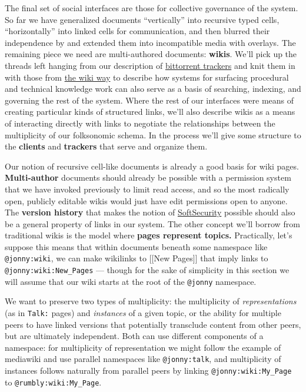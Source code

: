 The final set of social interfaces are those for collective governance
of the system. So far we have generalized documents ``vertically'' into
recursive typed cells, ``horizontally'' into linked cells for
communication, and then blurred their independence by and extended them
into incompatible media with overlays. The remaining piece we need are
multi-authored documents: \textbf{wikis}. We'll pick up the threads left
hanging from our description of
\protect\hyperlink{archives-need-communities}{bittorrent trackers} and
knit them in with those from \protect\hyperlink{the-wiki-way}{the wiki
way} to describe how systems for surfacing procedural and technical
knowledge work can also serve as a basis of searching, indexing, and
governing the rest of the system. Where the rest of our interfaces were
means of creating particular kinds of structured links, we'll also
describe wikis as a means of interacting directly with links to
negotiate the relationships between the multiplicity of our folksonomic
schema. In the process we'll give some structure to the \textbf{clients}
and \textbf{trackers} that serve and organize them.

Our notion of recursive cell-like documents is already a good basis for
wiki pages. \textbf{Multi-author} documents should already be possible
with a permission system that we have invoked previously to limit read
access, and so the most radically open, publicly editable wikis would
just have edit permissions open to anyone. The \textbf{version history}
that makes the notion of
\href{http://meatballwiki.org/wiki/SoftSecurity}{SoftSecurity} possible
should also be a general property of links in our system. The other
concept we'll borrow from traditional wikis is the model where
\textbf{pages represent topics.} Practically, let's suppose this means
that within documents beneath some namespace like \texttt{@jonny:wiki},
we can make wikilinks to {[}{[}New Pages{]}{]} that imply links to
\texttt{@jonny:wiki:New\_Pages} --- though for the sake of simplicity in
this section we will assume that our wiki starts at the root of the
\texttt{@jonny} namespace.

We want to preserve two types of multiplicity: the multiplicity of
\emph{representations} (as in \texttt{Talk:} pages) and \emph{instances}
of a given topic, or the ability for multiple peers to have linked
versions that potentially transclude content from other peers, but are
ultimately independent. Both can use different components of a
namespace: for multiplicity of representation we might follow the
example of mediawiki and use parallel namespaces like
\texttt{@jonny:talk}, and multiplicity of instances follows naturally
from parallel peers by linking \texttt{@jonny:wiki:My\_Page} to
\texttt{@rumbly:wiki:My\_Page}.

